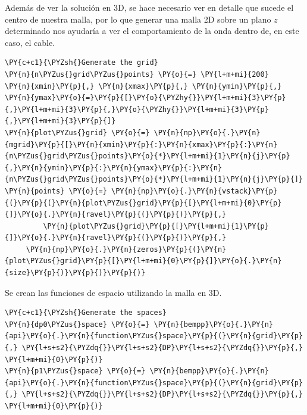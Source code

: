 Además de ver la solución en 3D, se hace necesario ver en detalle que sucede el centro  de nuestra malla, por lo que generar una malla 2D sobre un plano $z$ determinado nos ayudaría a ver el comportamiento de la onda dentro de, en este caso, el cable.
\begin{tcolorbox}
\begin{Verbatim}[commandchars=\\\{\}]
\PY{c+c1}{\PYZsh{}Generate the grid} 
\PY{n}{n\PYZus{}grid\PYZus{}points} \PY{o}{=} \PY{l+m+mi}{200}
\PY{n}{xmin}\PY{p}{,} \PY{n}{xmax}\PY{p}{,} \PY{n}{ymin}\PY{p}{,} \PY{n}{ymax}\PY{o}{=}\PY{p}{[}\PY{o}{\PYZhy{}}\PY{l+m+mi}{3}\PY{p}{,}\PY{l+m+mi}{3}\PY{p}{,}\PY{o}{\PYZhy{}}\PY{l+m+mi}{3}\PY{p}{,}\PY{l+m+mi}{3}\PY{p}{]}
\PY{n}{plot\PYZus{}grid} \PY{o}{=} \PY{n}{np}\PY{o}{.}\PY{n}{mgrid}\PY{p}{[}\PY{n}{xmin}\PY{p}{:}\PY{n}{xmax}\PY{p}{:}\PY{n}{n\PYZus{}grid\PYZus{}points}\PY{o}{*}\PY{l+m+mi}{1}\PY{n}{j}\PY{p}{,}\PY{n}{ymin}\PY{p}{:}\PY{n}{ymax}\PY{p}{:}\PY{n}{n\PYZus{}grid\PYZus{}points}\PY{o}{*}\PY{l+m+mi}{1}\PY{n}{j}\PY{p}{]}
\PY{n}{points} \PY{o}{=} \PY{n}{np}\PY{o}{.}\PY{n}{vstack}\PY{p}{(}\PY{p}{(}\PY{n}{plot\PYZus{}grid}\PY{p}{[}\PY{l+m+mi}{0}\PY{p}{]}\PY{o}{.}\PY{n}{ravel}\PY{p}{(}\PY{p}{)}\PY{p}{,}
         \PY{n}{plot\PYZus{}grid}\PY{p}{[}\PY{l+m+mi}{1}\PY{p}{]}\PY{o}{.}\PY{n}{ravel}\PY{p}{(}\PY{p}{)}\PY{p}{,}
	 \PY{n}{np}\PY{o}{.}\PY{n}{zeros}\PY{p}{(}\PY{n}{plot\PYZus{}grid}\PY{p}{[}\PY{l+m+mi}{0}\PY{p}{]}\PY{o}{.}\PY{n}{size}\PY{p}{)}\PY{p}{)}\PY{p}{)}
\end{Verbatim}
\end{tcolorbox}

Se crean las funciones de espacio utilizando la malla en 3D.
\begin{tcolorbox}
\begin{Verbatim}[commandchars=\\\{\}]
\PY{c+c1}{\PYZsh{}Generate the spaces} 
\PY{n}{dp0\PYZus{}space} \PY{o}{=} \PY{n}{bempp}\PY{o}{.}\PY{n}{api}\PY{o}{.}\PY{n}{function\PYZus{}space}\PY{p}{(}\PY{n}{grid}\PY{p}{,} \PY{l+s+s2}{\PYZdq{}}\PY{l+s+s2}{DP}\PY{l+s+s2}{\PYZdq{}}\PY{p}{,} \PY{l+m+mi}{0}\PY{p}{)}
\PY{n}{p1\PYZus{}space} \PY{o}{=} \PY{n}{bempp}\PY{o}{.}\PY{n}{api}\PY{o}{.}\PY{n}{function\PYZus{}space}\PY{p}{(}\PY{n}{grid}\PY{p}{,} \PY{l+s+s2}{\PYZdq{}}\PY{l+s+s2}{DP}\PY{l+s+s2}{\PYZdq{}}\PY{p}{,} \PY{l+m+mi}{0}\PY{p}{)}
\end{Verbatim}
\end{tcolorbox}


